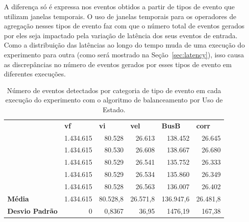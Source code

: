 A diferença só é expressa nos eventos obtidos a partir de tipos de evento que utilizam janelas temporais. O uso de janelas temporais para os operadores de agregação nesses tipos de evento faz com que o número total de eventos gerados por eles seja impactado pela variação de latência dos seus eventos de entrada. Como a distribuição das latências ao longo do tempo muda de uma execução do experimento para outra (como será mostrado na Seção~\ref{sec:latency}), isso causa as discrepâncias no número de eventos gerados por esses tipos de evento em diferentes execuções.





\begin{table}[h!]
\centering
\caption{Número de eventos detectados por categoria de tipo de evento em cada execução do experimento com o algoritmo de balanceamento por Uso de Estado.}
\begin{tabular}{lrrrrr}
          & \multicolumn{1}{l}{\textbf{vf}} & \multicolumn{1}{l}{\textbf{vi}} & \multicolumn{1}{l}{\textbf{vel}} & \multicolumn{1}{l}{\textbf{BusB}} & \multicolumn{1}{l}{\textbf{corr}}  \\
  & 1.434.615 & 80.528 & 26.613  & 138.452 & 26.645   \\
  & 1.434.615 & 80.530 & 26.608 & 138.667  & 26.680      \\
  & 1.434.615 & 80.529   & 26.541    & 135.752    & 26.333                     \\
  & 1.434.615 & 80.529   & 26.534    & 135.860    & 26.349                     \\
 & 1.434.615 & 80.528   & 26.563    & 136.007    & 26.402                     \\
\textbf{Média}      & 1.434.615 & 80.528,8 & 26.571,8  & 136.947,6  & 26.481,8                   \\
\textbf{Desvio Padrão}   & 0       & 0,8367      & 36,95        & 1476,19         & 167,38         
\end{tabular}
\label{Tab:events_SU_and_avg}
\end{table}


